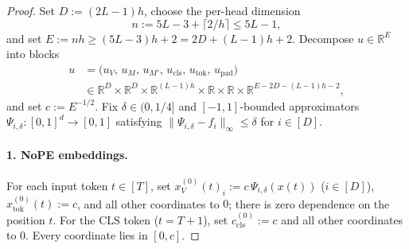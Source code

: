 \documentclass[11pt]{article}
\theoremstyle{plain}
\theoremstyle{definition}
\theoremstyle{remark}
\newcommand{\R}{\mathbb{R}}
\newcommand{\1}{\mathbf{1}}
\newcommand{\CLS}{\mathrm{CLS}}
\newcommand{\tok}{\mathrm{tok}}
\newcommand{\cls}{\mathrm{cls}}
\begin{document}
\begin{proof}
Set $D := (2L - 1)h$, choose the per-head dimension
\[
n := 5L - 3 + \lceil 2/h \rceil \le 5L - 1,
\]
and set $E := nh \ge (5L - 3)h + 2 = 2D + (L - 1)h + 2$. Decompose $u \in \R^E$ into blocks
\begin{align*}
u &= \bigl(u_V,\, u_M,\, u_{M'},\, u_{\cls},\, u_{\tok},\, u_{\mathrm{pad}}\bigr) \\
  &\in \R^D \times \R^D \times \R^{(L-1)h} \times \R \times \R \times \R^{E - 2D - (L-1)h - 2},
\end{align*}
and set $c := E^{-1/2}$. Fix $\delta \in (0, 1/4]$ and $[-1,1]$-bounded approximators $\Psi_{i,\delta} : [0,1]^d \to [0,1]$ satisfying $\|\Psi_{i,\delta} - f_i\|_\infty \le \delta$ for $i \in [D]$.

\paragraph{1. NoPE embeddings.}
For each input token $t \in [T]$, set $x^{(0)}_V(t)_i := c\,\Psi_{i,\delta}(x(t))$ ($i \in [D]$), $x^{(0)}_{\tok}(t) := c$, and all other coordinates to $0$; there is zero dependence on the position $t$. For the $\CLS$ token ($t = T+1$), set $c^{(0)}_{\cls} := c$ and all other coordinates to $0$. Every coordinate lies in $[0,c]$.


\end{proof}
\end{document}
